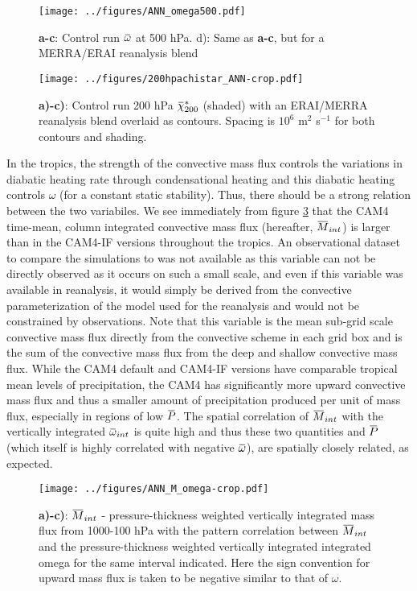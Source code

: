 \documentclass[letterpaper,12pt,titlepage,oneside,final]{book}
\newcommand{\overbar}[1]{\mkern 1.5mu\overline{\mkern-1.5mu#1\mkern-1.5mu}\mkern 1.5mu}
\begin{document}
\begin{figure}[H]
\centering
\noindent\texttt{[image: ../figures/ANN\_omega500.pdf]}\hfill
\caption{\footnotesize \textbf{a-c}: Control run $\overbar{\omega}$ at 500 hPa. d): Same as \textbf{a-c}, but for a MERRA/ERAI reanalysis blend}
\label{fig:omega}
\end{figure}

\begin{figure}[H]
\centering
\noindent\texttt{[image: ../figures/200hpachistar\_ANN-crop.pdf]}\hfill
\caption{\footnotesize \textbf{a)-c)}: Control run 200 hPa $\overbar{\chi}^{*}_{200}$ (shaded) with an ERAI/MERRA reanalysis blend overlaid as contours. Spacing is $10^{6}$ m$^{2}$ s$^{-1}$ for both contours and shading.}
\label{fig:chistar}
\end{figure}

In the tropics, the strength of the convective mass flux controls the variations in diabatic heating rate through condensational heating and this diabatic heating controls $\omega$ (for a constant static stability). Thus, there should be a strong relation between the two variabiles. We see immediately from figure \ref{fig:mcomeg} that the CAM4 time-mean, column integrated convective mass flux (hereafter, $\overbar{M}_{int}$) is larger than in the CAM4-IF versions throughout the tropics. An observational dataset to compare the simulations to was not available as this variable can not be directly observed as it occurs on such a small scale, and even if this variable was available in reanalysis, it would simply be derived from the convective parameterization of the model used for the reanalysis and would not be constrained by observations. Note that this variable is the mean sub-grid scale convective mass flux directly from the convective scheme in each grid box and is the sum of the convective mass flux from the deep and shallow convective mass flux. While the CAM4 default and CAM4-IF versions have comparable tropical mean levels of precipitation, the CAM4 has significantly more upward convective mass flux and thus a smaller amount of precipitation produced per unit of mass flux, especially in regions of low $\overbar{P}$. The spatial correlation of $\overbar{M}_{int}$ with the vertically integrated $\overbar{\omega}_{int}$ is quite high and thus these two quantities and $\overbar{P}$ (which itself is highly correlated with negative $\overbar{\omega}$), are spatially closely related, as expected.

\begin{figure}[H]
\centering
\noindent\texttt{[image: ../figures/ANN\_M\_omega-crop.pdf]}\hfill
\caption{\footnotesize \textbf{a)-c)}: $\overbar{M}_{int}$ - pressure-thickness weighted vertically integrated mass flux from 1000-100 hPa with the pattern correlation between $\overbar{M}_{int}$ and the pressure-thickness weighted vertically integrated integrated omega for the same interval indicated. Here the sign convention for upward mass flux is taken to be negative similar to that of $\omega$.}
\label{fig:mcomeg}
\end{figure}
 
\end{document}
